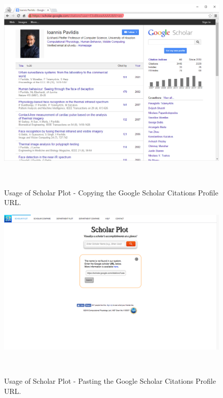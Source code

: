\begin{figure}
  \centering
  \includegraphics[width=1\textwidth]{figures/Support-2}
  \caption{Usage of Scholar Plot - Copying the Google Scholar Citations Profile URL.}~\label{fig:Support-2}
\end{figure}

\begin{figure}
  \centering
  \includegraphics[width=1\textwidth]{figures/fig-paste}
  \caption{Usage of Scholar Plot - Pasting the Google Scholar Citations Profile URL.}~\label{fig:Support-5}
\end{figure}